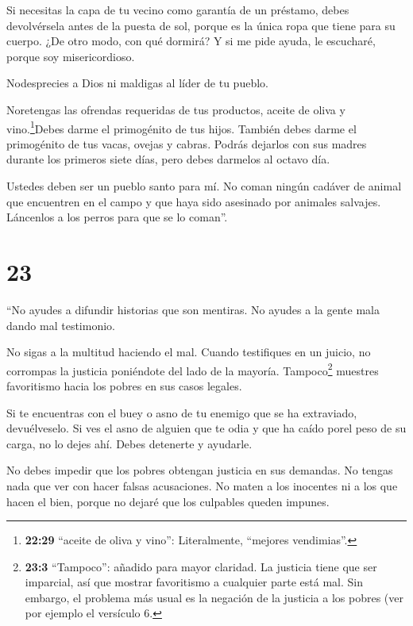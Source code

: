  Si necesitas la capa de tu vecino como garantía de un
préstamo, debes devolvérsela antes de la puesta de sol, 
porque es la única ropa que tiene para su cuerpo. ¿De otro modo, con qué
dormirá? Y si me pide ayuda, le escucharé, porque soy misericordioso.

 Nodesprecies a Dios ni maldigas al líder de tu pueblo.

 Noretengas las ofrendas requeridas de tus productos,
aceite de oliva y vino.\footnote{\textbf{22:29} ``aceite de oliva y
  vino'': Literalmente, ``mejores vendimias''.}Debes darme el
primogénito de tus hijos.  También debes darme el
primogénito de tus vacas, ovejas y cabras. Podrás dejarlos con sus
madres durante los primeros siete días, pero debes darmelos al octavo
día.

 Ustedes deben ser un pueblo santo para mí. No coman ningún
cadáver de animal que encuentren en el campo y que haya sido asesinado
por animales salvajes. Láncenlos a los perros para que se lo coman''.

\hypertarget{section-22}{%
\section{23}\label{section-22}}

 ``No ayudes a difundir historias que son mentiras. No
ayudes a la gente mala dando mal testimonio.

 No sigas a la multitud haciendo el mal. Cuando testifiques
en un juicio, no corrompas la justicia poniéndote del lado de la
mayoría.  Tampoco\footnote{\textbf{23:3} ``Tampoco'':
  añadido para mayor claridad. La justicia tiene que ser imparcial, así
  que mostrar favoritismo a cualquier parte está mal. Sin embargo, el
  problema más usual es la negación de la justicia a los pobres (ver por
  ejemplo el versículo 6.} muestres favoritismo hacia los pobres en sus
casos legales.

 Si te encuentras con el buey o asno de tu enemigo que se ha
extraviado, devuélveselo.  Si ves el asno de alguien que te
odia y que ha caído porel peso de su carga, no lo dejes ahí. Debes
detenerte y ayudarle.

 No debes impedir que los pobres obtengan justicia en sus
demandas.  No tengas nada que ver con hacer falsas
acusaciones. No maten a los inocentes ni a los que hacen el bien, porque
no dejaré que los culpables queden impunes.

